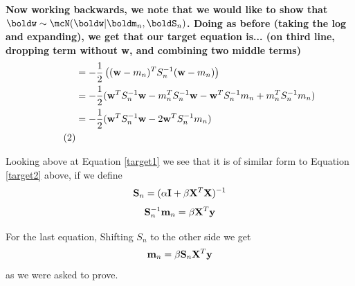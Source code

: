 \documentclass[submit]{harvardml}
\newenvironment{answer}{%
    \color{answergreen}\bf}
  {%
  }
\begin{document}
\begin{enumerate}
\begin{answer}
    Now working backwards, we note that we would like to show that
    $\boldw\sim\mcN(\boldw|\boldm_n,\boldS_n)$. Doing as before (taking the log
    and expanding), we get that our target equation is... (on third line,
    dropping term without w, and combining two middle terms) 
    \begin{align*}
        &= - \frac{1}{2} \left( (\bw-m_n)^T S_n^{-1} (\bw-m_n) \right) \\
        &= - \frac{1}{2} ( \bw^TS_n^{-1}\bw - m_n^TS_n^{-1}\bw - \bw^TS_n^{-1}m_n 
        + m_n^TS_n^{-1}m_n ) \\
        &= -\frac{1}{2} (\bw^TS_n^{-1}\bw - 2\bw^TS_n^{-1}m_n)  \\ %
        \addtocounter{equation}{1}\tag{2} \label{target2} \end{align*}

    Looking above at Equation \ref{target1} we see that it is of similar form
    to Equation \eqref{target2} above, if we define 
    $$ \mathbf{S}_n = (\alpha\mathbf{I} + \beta \mathbf{X}^T \mathbf{X})^{-1} $$ 
    $$ \mathbf{S}_n^{-1}\mathbf{m}_n = \beta \mathbf{X}^T \mathbf{y}$$

    For the last equation, Shifting $S_n$ to the other side we get
    $$ \mathbf{m}_n = \beta \mathbf{S}_n \mathbf{X}^T \mathbf{y} $$
    as we were asked to prove.








\end{answer}
\end{enumerate}
\end{document}
